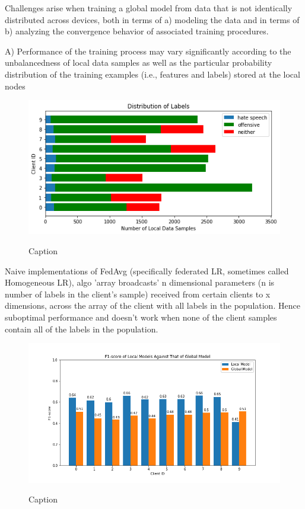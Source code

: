 \documentclass[letterpaper]{article} %
\begin{document}
Challenges arise when training a global model from data that is not identically distributed across devices, both in terms of a) modeling the data and in terms of b) analyzing the convergence behavior of associated training procedures.

A)  Performance of the training process may vary significantly according to the unbalancedness of local data samples as well as the particular probability distribution of the training examples (i.e., features and labels) stored at the local nodes

\begin{figure}[h]
{\includegraphics[width=\columnwidth]{noniid-distribution-based-label-imbalance_distribution_of_labels_2}}
\caption{Caption}
\end{figure}

Naive implementations of FedAvg (specifically federated LR, sometimes called Homogeneous LR), algo 'array broadcasts' n dimensional parameters (n is number of labels in the client's sample) received from certain clients to x dimensions, across the array of the client with all labels in the population. Hence suboptimal performance and doesn't work when none of the client samples contain all of the labels in the population.

\begin{figure}[h]
{\includegraphics[width=\columnwidth]{noniid-distribution-based-label-imbalance_2_F1-score across clients}}
\caption{Caption}
\end{figure}
\end{document}

